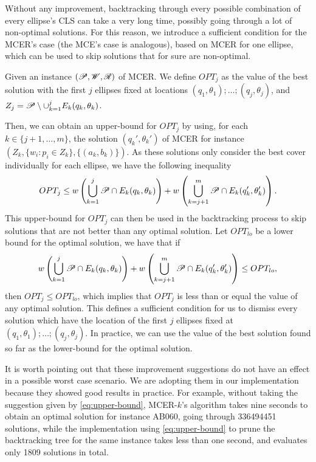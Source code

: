 Without any improvement, backtracking through every possible combination of every ellipse's CLS can take a very long time, possibly going through a lot of non-optimal solutions. 
For this reason, we introduce a sufficient condition for the MCER's case (the MCE's case is analogous), based on MCER for one ellipse, which can be used to skip solutions that for sure are non-optimal.

\begin{definition}
	Given an instance $(\mathscr{P}, \mathscr{W}, \mathscr{R})$ of MCER. We define $OPT_j$ as the value of the best solution with the first $j$ ellipses fixed at locations $(q_1, \theta_1); \dots; (q_j, \theta_j)$, and $Z_j=\mathscr{P} \setminus \cup_{k=1}^j E_k(q_k, \theta_k)$.
\end{definition}

Then, we can obtain an upper-bound for $OPT_j$ by using, for each $k\in\{j+1, \dots, m\}$, the solution $(q_k', \theta_k')$ of MCER for instance $(Z_k, \{w_i\colon p_i \in Z_k\}, \{(a_k, b_k)\})$. As these solutions only consider the best cover individually for each ellipse, we have the following inequality
\begin{equation*}
OPT_j \le w\left(\bigcup_{k=1}^{j} \mathscr{P} \cap E_k(q_k, \theta_k)\right) + w\left(\bigcup_{k=j+1}^{m} \mathscr{P} \cap E_k(q_k', \theta_k')\right).
\end{equation*}
This upper-bound for $OPT_j$ can then be used in the backtracking process to skip solutions that are not better than any optimal solution. Let $OPT_{lo}$ be a lower bound for the optimal solution, we have that if
\begin{equation}\label{eq:upper-bound}
w\left(\bigcup_{k=1}^{j} \mathscr{P} \cap E_k(q_k, \theta_k)\right) +w\left(\bigcup_{k=j+1}^{m} \mathscr{P} \cap E_k(q_k', \theta_k')\right) \le OPT_{lo},
\end{equation}
then $OPT_j \le OPT_{lo}$, which implies that $OPT_j$ is less than or equal the value of any optimal solution. This defines a sufficient condition for us to dismiss every solution which have the location of the first $j$ ellipses fixed at $(q_1, \theta_1); \dots; (q_j, \theta_j)$. In practice, we can use the value of the best solution found so far as the lower-bound for the optimal solution.

It is worth pointing out that these improvement suggestions do not have an effect in a possible worst case scenario. We are adopting them in our implementation because they showed good results in practice.
For example, without taking the suggestion given by \autoref{eq:upper-bound}, 
MCER-$k$'s algorithm takes nine seconds to obtain an optimal solution for instance AB060, going through \num{336494451} solutions, while the implementation using \autoref{eq:upper-bound} to prune the backtracking tree for the same instance takes less than one second, and evaluates only \num{1809} solutions in total.
